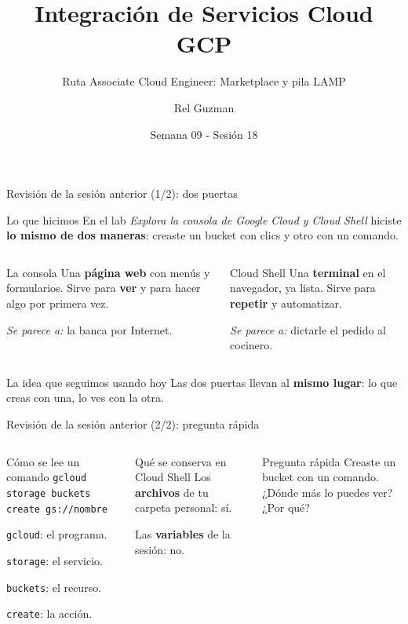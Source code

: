 \documentclass[aspectratio=169,10pt,c]{beamer}
\title{Integración de Servicios Cloud GCP}
\subtitle{Ruta Associate Cloud Engineer: Marketplace y pila LAMP}
\date{Semana 09 - Sesión 18}
\author{Rel Guzman}
\begin{document}
{\maketitle}

\begin{frame}{Revisión de la sesión anterior (1/2): dos puertas}
\begin{block}{Lo que hicimos}
\small En el lab \emph{Explora la consola de Google Cloud y Cloud Shell} hiciste \textbf{lo mismo de dos maneras}: creaste un bucket con clics y otro con un comando.
\end{block}
\begin{columns}[T,onlytextwidth]
\begin{exampleblock}{La consola}
\small Una \textbf{página web} con menús y formularios. Sirve para \textbf{ver} y para hacer algo por primera vez.\par\smallskip
\emph{Se parece a:} la banca por Internet.
\end{exampleblock}
\begin{exampleblock}{Cloud Shell}
\small Una \textbf{terminal} en el navegador, ya lista. Sirve para \textbf{repetir} y automatizar.\par\smallskip
\emph{Se parece a:} dictarle el pedido al cocinero.
\end{exampleblock}
\end{columns}
\par\vspace{1mm}
\begin{alertblock}{La idea que seguimos usando hoy}
\small Las dos puertas llevan al \textbf{mismo lugar}: lo que creas con una, lo ves con la otra.
\end{alertblock}
\end{frame}

\begin{frame}{Revisión de la sesión anterior (2/2): pregunta rápida}
\begin{columns}[T,onlytextwidth]
\begin{block}{Cómo se lee un comando}
\small \texttt{gcloud storage buckets create gs://nombre}\par\smallskip
\texttt{gcloud}: el programa.\par
\texttt{storage}: el servicio.\par
\texttt{buckets}: el recurso.\par
\texttt{create}: la acción.
\end{block}
\begin{exampleblock}{Qué se conserva en Cloud Shell}
\small Los \textbf{archivos} de tu carpeta personal: sí.\par
Las \textbf{variables} de la sesión: no.
\end{exampleblock}
\begin{alertblock}{Pregunta rápida}
\small Creaste un bucket con un comando. ¿Dónde más lo puedes ver? ¿Por qué?
\end{alertblock}
\end{columns}
\end{frame}
\end{document}
